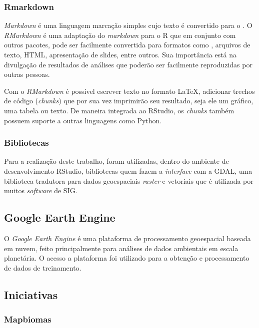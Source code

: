 \subsubsection{Rmarkdown}\label{rmarkdown}

\emph{Markdown} é uma linguagem marcação simples cujo texto é
convertido para o . O
\emph{RMarkdown} é uma adaptação do \emph{markdown} para o R que em
conjunto com outros pacotes, pode ser facilmente convertida para
formatos como , arquivos de texto,
\acs{HTML}, apresentação de slides, entre outros. Sua importância está na
divulgação de resultados de análises que poderão ser facilmente
reproduzidas por outras pessoas.

Com o \emph{RMarkdown} é possível escrever texto no formato LaTeX,
adicionar trechos de código (\emph{chunks}) que por sua vez imprimirão
seu resultado, seja ele um gráfico, uma tabela ou texto. De maneira
integrada ao RStudio, os \emph{chunks} também possuem suporte a outras
linguagens como Python.

\subsubsection{Bibliotecas}\label{bibliotecas}

Para a realização deste trabalho, foram utilizadas, dentro do ambiente
de desenvolvimento RStudio, bibliotecas quem fazem a \emph{interface}
com a \acs{GDAL}, uma biblioteca
tradutora para dados geoespaciais \emph{raster} e vetoriais que é
utilizada por muitos \emph{software} de \acs{SIG}.

\subsection{Google Earth Engine}\label{google-earth-engine}

O \emph{Google Earth Engine} é uma plataforma de processamento
geoespacial baseada em nuvem, feito principalmente para análises de
dados ambientais em escala planetária. O acesso a plataforma foi
utilizado para a obtenção e processamento de dados de treinamento. \cite{gorelick2017google}

\subsection{Iniciativas}\label{iniciativas}

\subsubsection{Mapbiomas}\label{mapbiomas}

